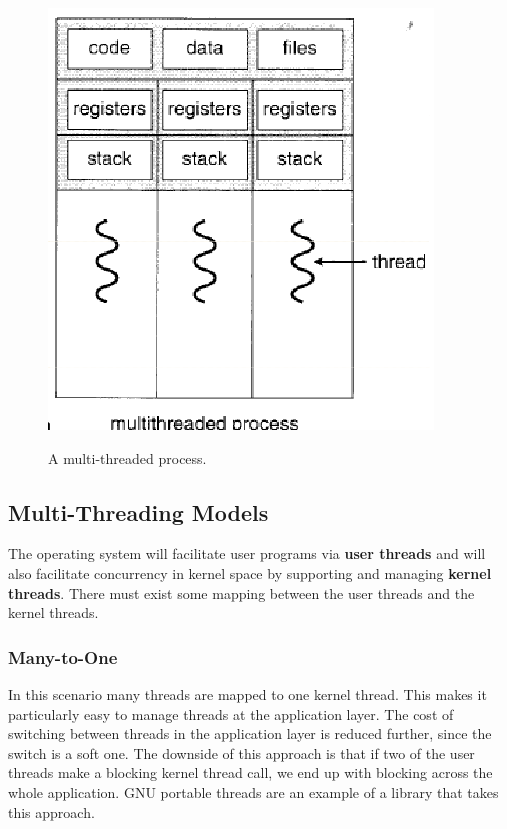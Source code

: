 \documentclass[10pt,a4paper]{article}
\begin{document}
\begin{figure}
\caption{A multi-threaded process. \cite{OSCONCEPTS}}
\begin{center}
\includegraphics[scale=0.45]{../images/multi-threaded-process.png}
\label{processthread}
\end{center}
\end{figure}
\subsection{Multi-Threading Models}
The operating system will facilitate user programs via {\bf user threads} and will also facilitate concurrency in kernel space by supporting and managing {\bf kernel threads}. There must exist some mapping between the user threads and the kernel threads.
\subsubsection{Many-to-One}
In this scenario many threads are mapped to one kernel thread. This makes it particularly easy to manage threads at the application layer. The cost of switching between threads in the application layer is reduced further, since the switch is a soft one. The downside of this approach is that if two of the user threads make a blocking kernel thread call, we end up with blocking across the whole application. GNU portable threads are an example of a library that takes this approach.  
\end{document}
